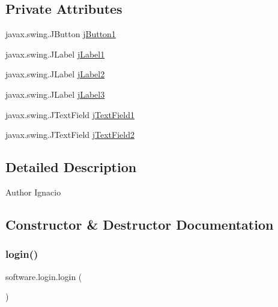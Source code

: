 \subsection*{Private Attributes}
\begin{DoxyCompactItemize}
\item 
javax.\+swing.\+J\+Button \mbox{\hyperlink{classsoftware_1_1login_a4dd489e2e09616f63d7fcbe94b4a6cd5}{j\+Button1}}
\item 
javax.\+swing.\+J\+Label \mbox{\hyperlink{classsoftware_1_1login_ad0f5337669524109d8aa4bdb121a2b6b}{j\+Label1}}
\item 
javax.\+swing.\+J\+Label \mbox{\hyperlink{classsoftware_1_1login_a58160102e1811efcd53ef135c19909a5}{j\+Label2}}
\item 
javax.\+swing.\+J\+Label \mbox{\hyperlink{classsoftware_1_1login_a35cc02634a69b5d3cf15f9ad2a4892dd}{j\+Label3}}
\item 
javax.\+swing.\+J\+Text\+Field \mbox{\hyperlink{classsoftware_1_1login_a690b80a1950fed323a4be5b825d60bce}{j\+Text\+Field1}}
\item 
javax.\+swing.\+J\+Text\+Field \mbox{\hyperlink{classsoftware_1_1login_a4e1d1476f2bc1aed6116d7ffb239eb52}{j\+Text\+Field2}}
\end{DoxyCompactItemize}


\subsection{Detailed Description}
\begin{DoxyAuthor}{Author}
Ignacio 
\end{DoxyAuthor}


\subsection{Constructor \& Destructor Documentation}
\mbox{\label{classsoftware_1_1login_a2169a57b945dc943e960524f043745cc}} 
\subsubsection{\texorpdfstring{login()}{login()}}
{\footnotesize\ttfamily software.\+login.\+login (\begin{DoxyParamCaption}{ }\end{DoxyParamCaption})\hspace{0.3cm}{\ttfamily [inline]}}


